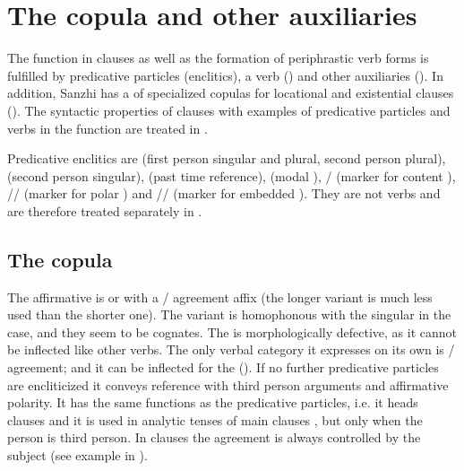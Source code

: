 \chapter{The copula and other auxiliaries}\label{cpt:copulaotherauxiliaries}
\largerpage[2]

The  function in  clauses as well as the formation of periphrastic verb forms is fulfilled by predicative particles (enclitics), a  verb () and other auxiliaries (). In addition, Sanzhi has a  of specialized copulas for locational and existential clauses (). The syntactic properties of  clauses with examples of predicative particles and verbs in the  function are treated in .

Predicative enclitics are  (first person singular and plural, second person plural),  (second person singular),  (past time reference),  (modal ), \slash{} (marker for content ), \slash{}\slash{} (marker for polar ) and \slash{}\slash{} (marker for embedded ). They are not verbs and are therefore treated separately in .



\section{The copula}
\label{sec:The copula}

The affirmative  is  or  with a / agreement affix (the longer variant is much less used than the shorter one). The variant  is homophonous with the singular  in the  case, and they seem to be cognates. The  is morphologically defective, as it cannot be inflected like other verbs. The only verbal category it expresses on its own is / agreement; and it can be inflected for the  (). If no further predicative particles are encliticized it conveys  reference with third person arguments and affirmative polarity. It has the same functions as the predicative particles, i.e. it heads  clauses  and it is used in analytic tenses of main clauses , but only when the person  is third person. In  clauses the agreement is always controlled by the subject (see example  in ).

